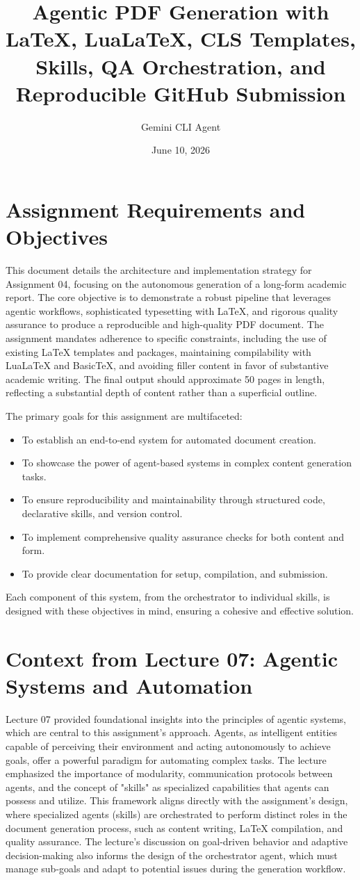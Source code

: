 \documentclass{custom-academic-template}
\title{Agentic PDF Generation with LaTeX, LuaLaTeX, CLS Templates, Skills, QA Orchestration, and Reproducible GitHub Submission}
\author{Gemini CLI Agent}
\date{June 10, 2026} %
\begin{document}
\maketitlepage
	\tableofcontents
\newpage

\section{Assignment Requirements and Objectives}
This document details the architecture and implementation strategy for Assignment 04, focusing on the autonomous generation of a long-form academic report. The core objective is to demonstrate a robust pipeline that leverages agentic workflows, sophisticated typesetting with LaTeX, and rigorous quality assurance to produce a reproducible and high-quality PDF document. The assignment mandates adherence to specific constraints, including the use of existing LaTeX templates and packages, maintaining compilability with LuaLaTeX and BasicTeX, and avoiding filler content in favor of substantive academic writing. The final output should approximate 50 pages in length, reflecting a substantial depth of content rather than a superficial outline.

The primary goals for this assignment are multifaceted:
\begin{itemize}
    \item To establish an end-to-end system for automated document creation.
    \item To showcase the power of agent-based systems in complex content generation tasks.
    \item To ensure reproducibility and maintainability through structured code, declarative skills, and version control.
    \item To implement comprehensive quality assurance checks for both content and form.
    \item To provide clear documentation for setup, compilation, and submission.
\end{itemize}
Each component of this system, from the orchestrator to individual skills, is designed with these objectives in mind, ensuring a cohesive and effective solution.

\section{Context from Lecture 07: Agentic Systems and Automation}
Lecture 07 provided foundational insights into the principles of agentic systems, which are central to this assignment's approach. Agents, as intelligent entities capable of perceiving their environment and acting autonomously to achieve goals, offer a powerful paradigm for automating complex tasks. The lecture emphasized the importance of modularity, communication protocols between agents, and the concept of "skills" as specialized capabilities that agents can possess and utilize. This framework aligns directly with the assignment's design, where specialized agents (skills) are orchestrated to perform distinct roles in the document generation process, such as content writing, LaTeX compilation, and quality assurance. The lecture's discussion on goal-driven behavior and adaptive decision-making also informs the design of the orchestrator agent, which must manage sub-goals and adapt to potential issues during the generation workflow.
\end{document}
